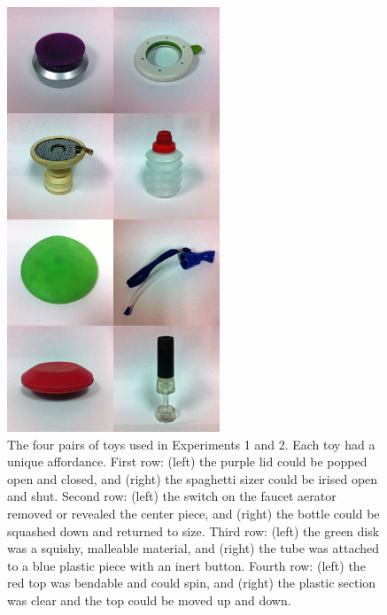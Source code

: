 \documentclass[man]{apa2}
\begin{document}
\begin{figure}
  \begin{center} 
    \includegraphics[width=2.5in]{figures/discourse_toys_images.jpg} 
    \caption{\label{fig:toys} The four pairs of toys used in Experiments 1 and 2. Each toy had a unique affordance. First row: (left) the purple lid could be popped open and closed, and (right) the spaghetti sizer could be irised open and shut.  Second row: (left) the switch on the faucet aerator removed or revealed the center piece, and (right) the bottle could be squashed down and returned to size.  Third row: (left) the green disk was a squishy, malleable material, and (right) the tube was attached to a blue plastic piece with an inert button.  Fourth row: (left) the red top was bendable and could spin, and (right) the plastic section was clear and the top could be moved up and down. } 
  \end{center} 
\end{figure}
\end{document}
